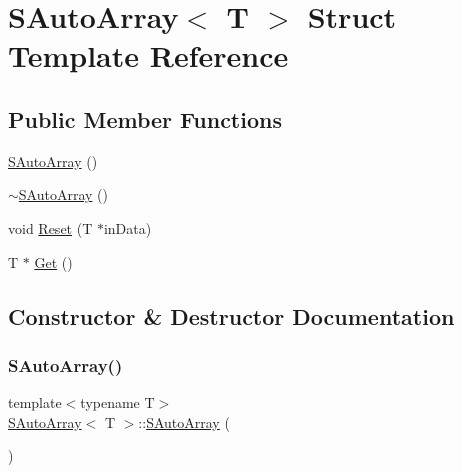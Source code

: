 \hypertarget{a01949}{}\section{S\+Auto\+Array$<$ T $>$ Struct Template Reference}
\label{a01949}
\subsection*{Public Member Functions}
\begin{DoxyCompactItemize}
\item 
\mbox{\hyperlink{a01949_a4e1caad56851939a486ad53bfd05221a}{S\+Auto\+Array}} ()
\item 
\mbox{\hyperlink{a01949_a44307013a0fe368d551b2407171896ed}{$\sim$\+S\+Auto\+Array}} ()
\item 
void \mbox{\hyperlink{a01949_a03fecb1c751d3f68d8f44f34126e363c}{Reset}} (T $\ast$in\+Data)
\item 
T $\ast$ \mbox{\hyperlink{a01949_a3d01a99320c3f2b0e542bd6113f19f29}{Get}} ()
\end{DoxyCompactItemize}


\subsection{Constructor \& Destructor Documentation}
\mbox{\label{a01949_a4e1caad56851939a486ad53bfd05221a}} 
\subsubsection{\texorpdfstring{SAutoArray()}{SAutoArray()}}
{\footnotesize\ttfamily template$<$typename T$>$ \\
\mbox{\hyperlink{a01949}{S\+Auto\+Array}}$<$ T $>$\+::\mbox{\hyperlink{a01949}{S\+Auto\+Array}} (\begin{DoxyParamCaption}{ }\end{DoxyParamCaption})\hspace{0.3cm}{\ttfamily [inline]}}

\mbox{\label{a01949_a44307013a0fe368d551b2407171896ed}} 
